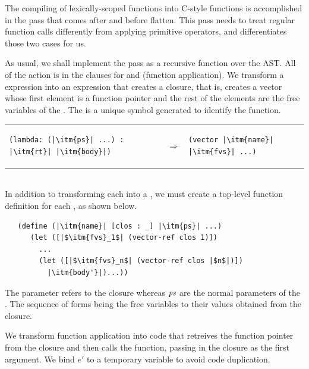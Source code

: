 \documentclass[11pt]{book}
\begin{document}
The compiling of lexically-scoped functions into C-style functions is
accomplished in the pass  that comes after
 and before flatten. This pass needs to treat
regular function calls differently from applying primitive operators,
and  differentiates those two cases for us.

As usual, we shall implement the pass as a recursive function over the
AST. All of the action is in the clauses for  and
 (function application). We transform a 
expression into an expression that creates a closure, that is, creates
a vector whose first element is a function pointer and the rest of the
elements are the free variables of the .  The 
is a unique symbol generated to identify the function.

\begin{tabular}{lll}
\begin{minipage}{0.4\textwidth}
\begin{lstlisting}
(lambda: (|\itm{ps}| ...) : |\itm{rt}| |\itm{body}|)
\end{lstlisting}
\end{minipage}
&
$\Rightarrow$
&
\begin{minipage}{0.4\textwidth}
\begin{lstlisting}
(vector |\itm{name}| |\itm{fvs}| ...)
\end{lstlisting}
\end{minipage}
\end{tabular}  \\
%
In addition to transforming each  into a , we
must create a top-level function definition for each , as
shown below.
\begin{lstlisting}
   (define (|\itm{name}| [clos : _] |\itm{ps}| ...)
      (let ([|$\itm{fvs}_1$| (vector-ref clos 1)])
        ...
        (let ([|$\itm{fvs}_n$| (vector-ref clos |$n$|)])
          |\itm{body'}|)...))
\end{lstlisting}
The  parameter refers to the closure whereas $\mathit{ps}$ are
the normal parameters of the . The sequence of 
forms being the free variables to their values obtained from the
closure.

We transform function application into code that retreives the
function pointer from the closure and then calls the function, passing
in the closure as the first argument. We bind $e'$ to a temporary
variable to avoid code duplication.
\end{document}
